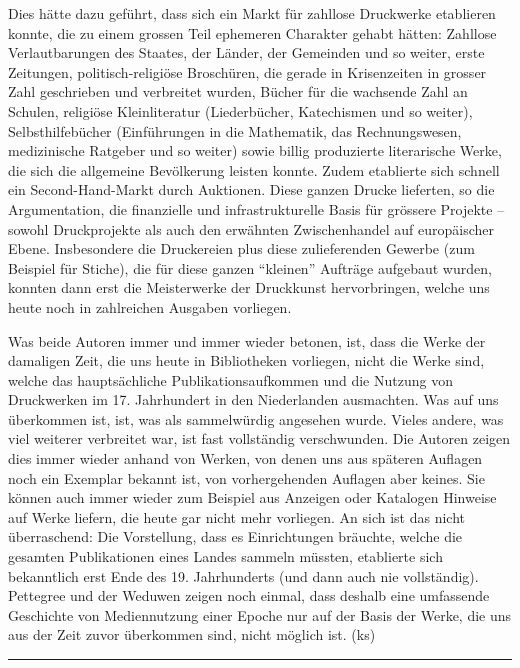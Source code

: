 \documentclass[a4paper,
fontsize=11pt,
oneside,
numbers=noperiodatend,
parskip=half-,
bibliography=totoc,
final
]{scrartcl}
\begin{document}
Dies hätte dazu geführt, dass sich ein Markt für zahllose Druckwerke
etablieren konnte, die zu einem grossen Teil ephemeren Charakter gehabt
hätten: Zahllose Verlautbarungen des Staates, der Länder, der Gemeinden
und so weiter, erste Zeitungen, politisch-religiöse Broschüren, die
gerade in Krisenzeiten in grosser Zahl geschrieben und verbreitet
wurden, Bücher für die wachsende Zahl an Schulen, religiöse
Kleinliteratur (Liederbücher, Katechismen und so weiter),
Selbsthilfebücher (Einführungen in die Mathematik, das Rechnungswesen,
medizinische Ratgeber und so weiter) sowie billig produzierte
literarische Werke, die sich die allgemeine Bevölkerung leisten konnte.
Zudem etablierte sich schnell ein Second-Hand-Markt durch Auktionen.
Diese ganzen Drucke lieferten, so die Argumentation, die finanzielle und
infrastrukturelle Basis für grössere Projekte -- sowohl Druckprojekte
als auch den erwähnten Zwischenhandel auf europäischer Ebene.
Insbesondere die Druckereien plus diese zulieferenden Gewerbe (zum
Beispiel für Stiche), die für diese ganzen \enquote{kleinen} Aufträge
aufgebaut wurden, konnten dann erst die Meisterwerke der Druckkunst
hervorbringen, welche uns heute noch in zahlreichen Ausgaben vorliegen.

Was beide Autoren immer und immer wieder betonen, ist, dass die Werke
der damaligen Zeit, die uns heute in Bibliotheken vorliegen, nicht die
Werke sind, welche das hauptsächliche Publikationsaufkommen und die
Nutzung von Druckwerken im 17. Jahrhundert in den Niederlanden
ausmachten. Was auf uns überkommen ist, ist, was als sammelwürdig
angesehen wurde. Vieles andere, was viel weiterer verbreitet war, ist
fast vollständig verschwunden. Die Autoren zeigen dies immer wieder
anhand von Werken, von denen uns aus späteren Auflagen noch ein Exemplar
bekannt ist, von vorhergehenden Auflagen aber keines. Sie können auch
immer wieder zum Beispiel aus Anzeigen oder Katalogen Hinweise auf Werke
liefern, die heute gar nicht mehr vorliegen. An sich ist das nicht
überraschend: Die Vorstellung, dass es Einrichtungen bräuchte, welche
die gesamten Publikationen eines Landes sammeln müssten, etablierte sich
bekanntlich erst Ende des 19. Jahrhunderts (und dann auch nie
vollständig). Pettegree und der Weduwen zeigen noch einmal, dass deshalb
eine umfassende Geschichte von Mediennutzung einer Epoche nur auf der
Basis der Werke, die uns aus der Zeit zuvor überkommen sind, nicht
möglich ist. (ks)

\begin{center}\rule{0.5\linewidth}{0.5pt}\end{center}
\end{document}
